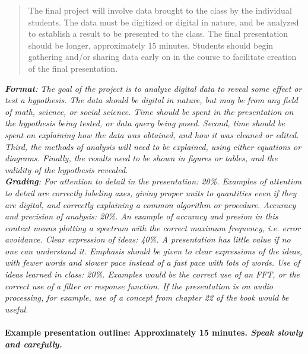 \documentclass[10pt]{article}
\begin{document}
\maketitle

\begin{abstract}
The final project will involve data brought to the class by the individual students.  The data must be digitized or digital in nature, and be analyzed to establish a result to be presented to the class.  The final presentation should be longer, approximately 15 minutes.  Students should begin gathering and/or sharing data early on in the course to facilitate creation of the final presentation.
\end{abstract}
\noindent
\textit{\textbf{Format}: The goal of the project is to analyze digital data to reveal some effect or test a hypothesis.  The data should be digital in nature, but may be from any field of math, science, or social science.  Time should be spent in the presentation on the hypothesis being tested, or data query being posed.  Second, time should be spent on explaining how the data was obtained, and how it was cleaned or edited.  Third, the methods of analysis will need to be explained, using either equations or diagrams.  Finally, the results need to be shown in figures or tables, and the validity of the hypothesis revealed.} \\
\textit{\textbf{Grading}: For attention to detail in the presentation: 20\%.  Examples of attention to detail are correctly labeling axes, giving proper units to quantities even if they are digital, and correctly explaining a common algorithm or procedure.  Accuracy and precision of analysis: 20\%.  An example of accuracy and presion in this context means plotting a spectrum with the correct maximum frequency, i.e. error avoidance.  Clear expression of ideas: 40\%.  A presentation has little value if no one can understand it.  Emphasis should be given to clear expressions of the ideas, with fewer words and slower pace instead of a fast pace with lots of words.  Use of ideas learned in class: 20\%.  Examples would be the correct use of an FFT, or the correct use of a filter or response function.  If the presentation is on audio processing, for example, use of a concept from chapter 22 of the book would be useful.} \\ \\
\textbf{Example presentation outline: Approximately 15 minutes.  \textit{Speak slowly and carefully.}}
\end{document}
